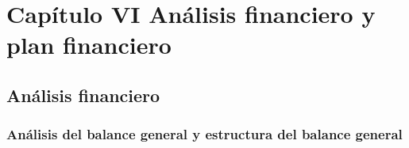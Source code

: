 \documentclass[
  stu,
  floatsintext,
  longtable,
  a4paper,
  nolmodern,
  notxfonts,
  notimes,
  12pt,
  colorlinks=true,linkcolor=blue,citecolor=blue,urlcolor=blue]{apa7}
\begin{document}
\section{Capítulo VI Análisis financiero y plan
financiero}\label{capuxedtulo-vi-anuxe1lisis-financiero-y-plan-financiero}

\subsection{Análisis financiero}\label{anuxe1lisis-financiero}

\subsubsection{Análisis del balance general y estructura del balance
general}\label{anuxe1lisis-del-balance-general-y-estructura-del-balance-general}
\end{document}
